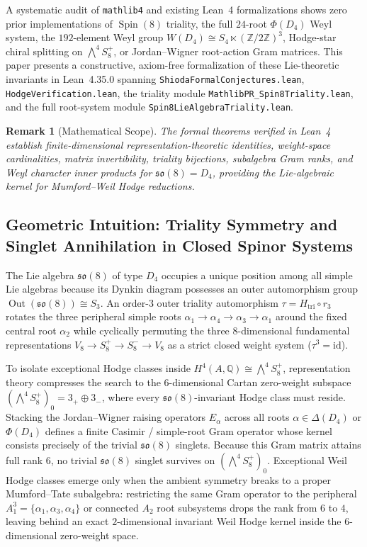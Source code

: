 \documentclass[11pt,a4paper]{article}
\newtheorem{remark}[theorem]{Remark}
\begin{document}
A systematic audit of \texttt{mathlib4} and existing Lean~4 formalizations shows zero prior implementations of $\operatorname{Spin}(8)$ triality, the full $24$-root $\Phi(D_4)$ Weyl system, the $192$-element Weyl group $W(D_4) \cong S_4 \ltimes (\mathbb{Z}/2\mathbb{Z})^3$, Hodge-star chiral splitting on $\bigwedge^4 S^+_8$, or Jordan--Wigner root-action Gram matrices. This paper presents a constructive, axiom-free formalization of these Lie-theoretic invariants in Lean~4.35.0 spanning \texttt{ShiodaFormalConjectures.lean}, \texttt{HodgeVerification.lean}, the triality module \texttt{MathlibPR\_Spin8Triality.lean}, and the full root-system module \texttt{Spin8LieAlgebraTriality.lean}.

\begin{remark}[Mathematical Scope]
  The formal theorems verified in Lean~4 establish finite-dimensional representation-theoretic identities, weight-space cardinalities, matrix invertibility, triality bijections, subalgebra Gram ranks, and Weyl character inner products for $\mathfrak{so}(8) = D_4$, providing the Lie-algebraic kernel for Mumford--Weil Hodge reductions.
\end{remark}

\subsection{Geometric Intuition: Triality Symmetry and Singlet Annihilation in Closed Spinor Systems}

The Lie algebra $\mathfrak{so}(8)$ of type $D_4$ occupies a unique position among all simple Lie algebras because its Dynkin diagram possesses an outer automorphism group $\operatorname{Out}(\mathfrak{so}(8)) \cong S_3$. An order-$3$ outer triality automorphism $\tau = H_{\mathrm{tri}} \circ r_3$ rotates the three peripheral simple roots $\alpha_1 \to \alpha_4 \to \alpha_3 \to \alpha_1$ around the fixed central root $\alpha_2$ while cyclically permuting the three $8$-dimensional fundamental representations $V_8 \to S^+_8 \to S^-_8 \to V_8$ as a strict closed weight system ($\tau^3 = \mathrm{id}$).

To isolate exceptional Hodge classes inside $H^4(A, \mathbb{Q}) \cong \bigwedge^4 S^+_8$, representation theory compresses the search to the $6$-dimensional Cartan zero-weight subspace $(\bigwedge^4 S^+_8)_0 = 3_+ \oplus 3_-$, where every $\mathfrak{so}(8)$-invariant Hodge class must reside. Stacking the Jordan--Wigner raising operators $E_\alpha$ across all roots $\alpha \in \Delta(D_4)$ or $\Phi(D_4)$ defines a finite Casimir / simple-root Gram operator whose kernel consists precisely of the trivial $\mathfrak{so}(8)$ singlets. Because this Gram matrix attains full rank $6$, no trivial $\mathfrak{so}(8)$ singlet survives on $(\bigwedge^4 S^+_8)_0$. Exceptional Weil Hodge classes emerge only when the ambient symmetry breaks to a proper Mumford--Tate subalgebra: restricting the same Gram operator to the peripheral $A_1^3 = \{\alpha_1, \alpha_3, \alpha_4\}$ or connected $A_2$ root subsystems drops the rank from $6$ to $4$, leaving behind an exact $2$-dimensional invariant Weil Hodge kernel inside the $6$-dimensional zero-weight space.
\end{document}
